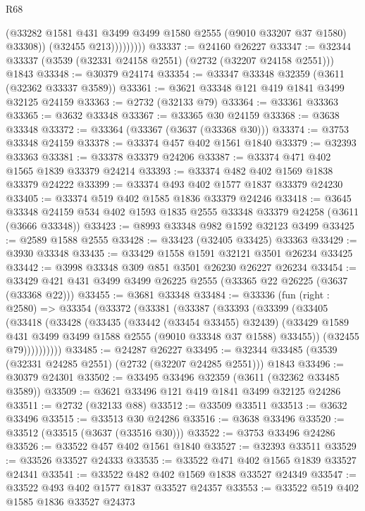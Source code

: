 \begin{lexlean}{R68}
\begin{coremodule}
                      (@33282 @1581 @431 @3499 @3499 @1580 @2555 (@9010 @33207 @37 @1580) @33308))
                    (@32455 @213)))))))))
@33337 := @24160 @26227
@33347 := @32344 @33337 (@3539 (@32331 @24158 @2551) (@2732 (@32207 @24158 @2551))) @1843
@33348 := @30379 @24174
@33354 := @33347 @33348 @32359 (@3611 (@32362 @33337 @3589))
@33361 := @3621 @33348 @121 @419 @1841 @3499 @32125 @24159
@33363 := @2732 (@32133 @79)
@33364 := @33361 @33363
@33365 := @3632 @33348
@33367 := @33365 @30 @24159
@33368 := @3638 @33348
@33372 := @33364 (@33367 (@3637 (@33368 @30)))
@33374 := @3753 @33348 @24159
@33378 := @33374 @457 @402 @1561 @1840
@33379 := @32393 @33363
@33381 := @33378 @33379 @24206
@33387 := @33374 @471 @402 @1565 @1839 @33379 @24214
@33393 := @33374 @482 @402 @1569 @1838 @33379 @24222
@33399 := @33374 @493 @402 @1577 @1837 @33379 @24230
@33405 := @33374 @519 @402 @1585 @1836 @33379 @24246
@33418 := @3645
    @33348
    @24159
    @534
    @402
    @1593
    @1835
    @2555
    @33348
    @33379
    @24258
    (@3611 (@3666 @33348))
@33423 := @8993 @33348 @982 @1592 @32123 @3499
@33425 := @2589 @1588 @2555
@33428 := @33423 (@32405 @33425) @33363
@33429 := @3930 @33348
@33435 := @33429 @1558 @1591 @32121 @3501 @26234 @33425
@33442 := @3998 @33348 @309 @851 @3501 @26230 @26227 @26234
@33454 := @33429 @421 @431 @3499 @3499 @26225 @2555 (@33365 @22 @26225 (@3637 (@33368 @22)))
@33455 := @3681 @33348
@33484 := @33336
    (fun (right : @2580) =>
    @33354
      (@33372
        (@33381
          (@33387
            (@33393
              (@33399
                (@33405
                  (@33418
                    (@33428
                      (@33435
                        (@33442 (@33454 @33455) @32439)
                        (@33429 @1589 @431 @3499 @3499 @1588 @2555 (@9010 @33348 @37 @1588) @33455))
                      (@32455 @79))))))))))
@33485 := @24287 @26227
@33495 := @32344 @33485 (@3539 (@32331 @24285 @2551) (@2732 (@32207 @24285 @2551))) @1843
@33496 := @30379 @24301
@33502 := @33495 @33496 @32359 (@3611 (@32362 @33485 @3589))
@33509 := @3621 @33496 @121 @419 @1841 @3499 @32125 @24286
@33511 := @2732 (@32133 @88)
@33512 := @33509 @33511
@33513 := @3632 @33496
@33515 := @33513 @30 @24286
@33516 := @3638 @33496
@33520 := @33512 (@33515 (@3637 (@33516 @30)))
@33522 := @3753 @33496 @24286
@33526 := @33522 @457 @402 @1561 @1840
@33527 := @32393 @33511
@33529 := @33526 @33527 @24333
@33535 := @33522 @471 @402 @1565 @1839 @33527 @24341
@33541 := @33522 @482 @402 @1569 @1838 @33527 @24349
@33547 := @33522 @493 @402 @1577 @1837 @33527 @24357
@33553 := @33522 @519 @402 @1585 @1836 @33527 @24373

\end{coremodule}
\end{lexlean}
